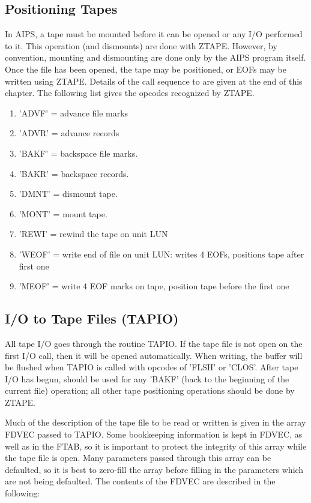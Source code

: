 
\subsection{Positioning Tapes}
In AIPS, a tape must be mounted before it can be opened or any I/O
performed to it.  This operation (and dismounts) are done with ZTAPE.
However, by convention, mounting and dismounting are done only by the
AIPS program itself. Once the file has been opened, the tape may be
positioned, or EOFs may be written using ZTAPE. Details of the call
sequence to  are given at the end of this chapter.  The
following list gives the opcodes recognized by ZTAPE.
\begin{enumerate} %
\item 'ADVF' = advance file marks
\item 'ADVR' = advance records
\item 'BAKF' = backspace file marks.
\item 'BAKR' = backspace records.
\item 'DMNT' = dismount tape.
\item 'MONT' = mount tape.
\item 'REWI' = rewind the tape on unit LUN
\item 'WEOF' = write end of file on unit LUN: writes 4 EOFs, positions tape
after first one
\item 'MEOF' = write 4 EOF marks on tape, position tape before the first
one

\end{enumerate} %

\subsection{I/O to Tape Files (TAPIO)}
All tape I/O goes through the routine TAPIO. If the tape file is not
open on the first I/O call, then it will be opened automatically. When
writing, the buffer will be flushed when TAPIO is called with opcodes
of 'FLSH' or 'CLOS'.  After tape I/O has begun,  should
be used for any 'BAKF' (back to the beginning of the current file)
operation; all other tape positioning operations should be done by
ZTAPE.

Much of the description of the tape file to be read or written is
given in the array FDVEC passed to TAPIO.  Some bookkeeping information
is kept in FDVEC, as well as in the FTAB, so it is important to
protect the integrity of this array while the tape file is open.  Many
parameters passed through this array can be defaulted, so it is best
to zero-fill the array before filling in the parameters which are not
being defaulted.  The contents of the FDVEC are described in the
following:

